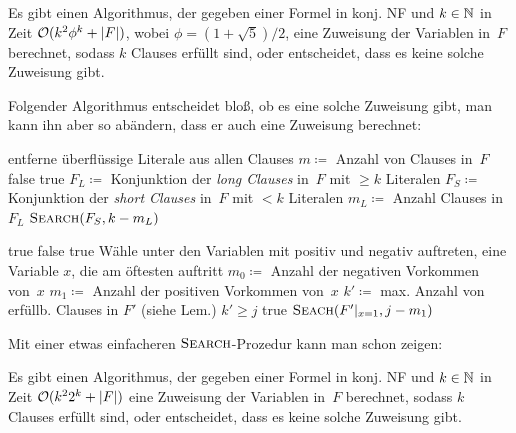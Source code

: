 \documentclass{cheat-sheet}
\newcommand{\size}[1]{\abs{#1}} %
\renewcommand{\O}{\mathcal{O}} %
\newcommand{\floor}[1]{\lfloor #1 \rfloor} %
\begin{document}
\begin{satz}
  Es gibt einen Algorithmus, der gegeben einer Formel in konj. NF und $k \in \mathbb{N}$ in Zeit $\O(k^2 \phi^k + \size{F})$, wobei $\phi = (1 + \sqrt{5}) / 2$, eine Zuweisung der Variablen in~$F$ berechnet, sodass $k$ Clauses erfüllt sind, oder entscheidet, dass es keine solche Zuweisung gibt.
\end{satz}

Folgender Algorithmus entscheidet bloß, ob es eine solche Zuweisung gibt, man kann ihn aber so abändern, dass er auch eine Zuweisung berechnet:

\begin{algorithmic}
    \State entferne überflüssige Literale aus allen Clauses
    \State $m \coloneqq $ Anzahl von Clauses in~$F$
     \Return false \EndIf
    \If{$k \leq \floor{m/2}$} \Return true \EndIf
    \State $F_L \coloneqq $ Konjunktion der \textit{long Clauses} in~$F$ mit $\geq k$ Literalen
    \State $F_S \coloneqq $ Konjunktion der \textit{short Clauses} in~$F$ mit $< k$ Literalen
    \State $m_L \coloneqq $ Anzahl Clauses in $F_L$
    \Return $\Call{Search}{F_S, k - m_L}$
  \EndFunction

     \Return true \EndIf
     \Return false \EndIf
      \State \Return true
    \EndIf
    \State Wähle unter den Variablen mit positiv und negativ auftreten,
    \State \quad eine Variable $x$, die am öftesten auftritt
    \State $m_0 \coloneqq $ Anzahl der negativen Vorkommen von~$x$
    \State $m_1 \coloneqq $ Anzahl der positiven Vorkommen von~$x$
      \State $k' \coloneqq $ max. Anzahl von erfüllb. Clauses in $F'$ (siehe Lem.)
      \State \Return $k' \geq j$
    \Else
        \Return true
      \EndIf
      \Return $\Call{Seach}{F'|_{x=1}, j - m_1}$
    \EndIf
  \EndFunction
\end{algorithmic}

Mit einer etwas einfacheren $\Call{Search}{}$-Prozedur kann man schon zeigen:

\begin{satz}
  Es gibt einen Algorithmus, der gegeben einer Formel in konj. NF und $k \in \mathbb{N}$ in Zeit $\O(k^2 2^k + \size{F})$ eine Zuweisung der Variablen in~$F$ berechnet, sodass $k$ Clauses erfüllt sind, oder entscheidet, dass es keine solche Zuweisung gibt.
\end{satz}
\end{document}
